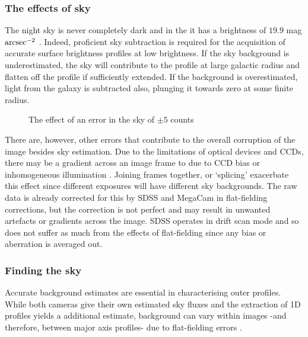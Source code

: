 \subsubsection{The effects of sky}
The night sky is never completely dark and in the \iband it has a brightness of $19.9$ mag $\rm{arcsec}^{-2}$ \citep{binney_galactic_1998}. Indeed, proficient sky subtraction is required for the acquisition of accurate surface brightness profiles at low brightness. If the sky background is underestimated, the sky will contribute to the profile at large galactic radius and flatten off the profile if sufficiently extended. If the background is overestimated, light from the galaxy is subtracted also, plunging it towards zero at some finite radius. 
\begin{figure}[h]
	\centering
	\caption{The effect of an error in the sky of $\pm 5$ counts}
	\label{fig: effects of sky}
\end{figure}
There are, however, other errors that contribute to the overall corruption of the image besides sky estimation. Due to the limitations of optical devices and CCDs, there may be a gradient across an image frame to due to CCD bias or inhomogeneous illumination \citep{olsen_radiometric_2010}. Joining frames together, or `splicing' exacerbate this effect since different exposures will have different sky backgrounds. The raw data is already corrected for this by SDSS and MegaCam in flat-fielding corrections, but the correction is not perfect and may result in unwanted artefacts or gradients across the image. SDSS operates in drift scan mode \citep{abazajian_seventh_2009} and so does not suffer as much from the effects of flat-fielding since any bias or aberration is averaged out.

\subsubsection{Finding the sky}
Accurate background estimates are essential in characterising outer profiles. While both cameras give their own estimated sky fluxes and the extraction of 1D profiles yields a additional estimate, background can vary within images -and therefore, between major axis profiles- due to flat-fielding errors \citep{bijaoui_sky_1980}. 

